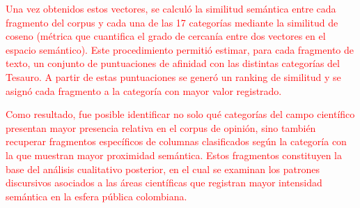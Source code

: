 \documentclass[11pt,a4paper]{article}
\begin{document}
\textcolor{red}{Una vez obtenidos estos vectores, se calculó la similitud semántica entre cada fragmento del corpus y cada una de las 17 categorías mediante la similitud de coseno (métrica que cuantifica el grado de cercanía entre dos vectores en el espacio semántico). Este procedimiento permitió estimar, para cada fragmento de texto, un conjunto de puntuaciones de afinidad con las distintas categorías del Tesauro. A partir de estas puntuaciones se generó un ranking de similitud y se asignó cada fragmento a la categoría con mayor valor registrado.}
	
\textcolor{red}{Como resultado, fue posible identificar no solo qué categorías del campo científico presentan mayor presencia relativa en el corpus de opinión, sino también recuperar fragmentos específicos de columnas clasificados según la categoría con la que muestran mayor proximidad semántica. Estos fragmentos constituyen la base del análisis cualitativo posterior, en el cual se examinan los patrones discursivos asociados a las áreas científicas que registran mayor intensidad semántica en la esfera pública colombiana.}
%	
%	
	
\end{document}
